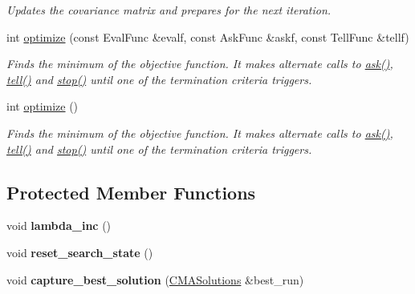\begin{DoxyCompactItemize}
\begin{DoxyCompactList}\small\item\em Updates the covariance matrix and prepares for the next iteration. \end{DoxyCompactList}\item 
int \hyperlink{classlibcmaes_1_1IPOPCMAStrategy_a50555839c736d8189704d5d6d8e87553}{optimize} (const Eval\+Func \&evalf, const Ask\+Func \&askf, const Tell\+Func \&tellf)
\begin{DoxyCompactList}\small\item\em Finds the minimum of the objective function. It makes alternate calls to \hyperlink{classlibcmaes_1_1CMAStrategy_ab7266bc50732458ffcab690bc26380e6}{ask()}, \hyperlink{classlibcmaes_1_1IPOPCMAStrategy_a9b3b59e7caf752f48b37500d84736137}{tell()} and \hyperlink{classlibcmaes_1_1CMAStrategy_adc87b9c500959c800b6bc93d89432ecc}{stop()} until one of the termination criteria triggers. \end{DoxyCompactList}\item 
int \hyperlink{classlibcmaes_1_1IPOPCMAStrategy_a9c4f8ae0a8cbf600ba8fe7270e63172a}{optimize} ()
\begin{DoxyCompactList}\small\item\em Finds the minimum of the objective function. It makes alternate calls to \hyperlink{classlibcmaes_1_1CMAStrategy_ab7266bc50732458ffcab690bc26380e6}{ask()}, \hyperlink{classlibcmaes_1_1IPOPCMAStrategy_a9b3b59e7caf752f48b37500d84736137}{tell()} and \hyperlink{classlibcmaes_1_1CMAStrategy_adc87b9c500959c800b6bc93d89432ecc}{stop()} until one of the termination criteria triggers. \end{DoxyCompactList}\end{DoxyCompactItemize}
\subsection*{Protected Member Functions}
\begin{DoxyCompactItemize}
\item 
\hypertarget{classlibcmaes_1_1IPOPCMAStrategy_a210bde295a32c8da7906729831fcf5e2}{void {\bfseries lambda\+\_\+inc} ()}\label{classlibcmaes_1_1IPOPCMAStrategy_a210bde295a32c8da7906729831fcf5e2}

\item 
\hypertarget{classlibcmaes_1_1IPOPCMAStrategy_a8de562ec27e295c3b2517b1669fef0be}{void {\bfseries reset\+\_\+search\+\_\+state} ()}\label{classlibcmaes_1_1IPOPCMAStrategy_a8de562ec27e295c3b2517b1669fef0be}

\item 
\hypertarget{classlibcmaes_1_1IPOPCMAStrategy_a2f4d09dc1a86de8e4a1116cce4e518e8}{void {\bfseries capture\+\_\+best\+\_\+solution} (\hyperlink{classlibcmaes_1_1CMASolutions}{C\+M\+A\+Solutions} \&best\+\_\+run)}\label{classlibcmaes_1_1IPOPCMAStrategy_a2f4d09dc1a86de8e4a1116cce4e518e8}

\end{DoxyCompactItemize}
